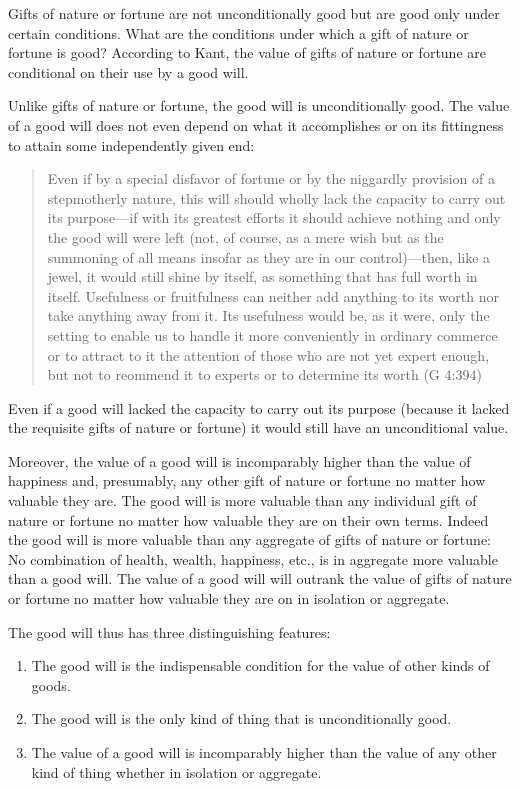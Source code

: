 Gifts of nature or fortune are not unconditionally good but are good only under certain conditions. What are the conditions under which a gift of nature or fortune is good? According to Kant, the value of gifts of nature or fortune are conditional on their use by a good will.

Unlike gifts of nature or fortune, the good will is unconditionally good. The value of a good will does not even depend on what it accomplishes or on its fittingness to attain some independently given end:

\begin{quote}
	Even if by a special disfavor of fortune or by the niggardly provision of a stepmotherly nature, this will should wholly lack the capacity to carry out its purpose—if with its greatest efforts it should achieve nothing and only the good will were left (not, of course, as a mere wish but as the summoning of all means insofar as they are in our control)---then, like a jewel, it would still shine by itself, as something that has full worth in itself. Usefulness or fruitfulness can neither add anything to its worth nor take anything away from it. Its usefulness would be, as it were, only the setting to enable us to handle it more conveniently in ordinary commerce or to attract to it the attention of those who are not yet expert enough, but not to reommend it to experts or to determine its worth (G 4:394)
\end{quote}


Even if a good will lacked the capacity to carry out its purpose (because it lacked the requisite gifts of nature or fortune) it would still have an unconditional value.

Moreover, the value of a good will is incomparably higher than the value of happiness and, presumably, any other gift of nature or fortune no matter how valuable they are. The good will is more valuable than any individual gift of nature or fortune no matter how valuable they are on their own terms. Indeed the good will is more valuable than any aggregate of gifts of nature or fortune: No combination of health, wealth, happiness, etc., is in aggregate more valuable than a good will. The value of a good will will outrank the value of gifts of nature or fortune no matter how valuable they are on in isolation or aggregate.

The good will thus has three distinguishing features:

\begin{enumerate}
	\item The good will is the indispensable condition for the value of other kinds of goods.
	\item The good will is the only kind of thing that is unconditionally good.
	\item The value of a good will is incomparably higher than the value of any other kind of thing whether in isolation or aggregate.
\end{enumerate}

